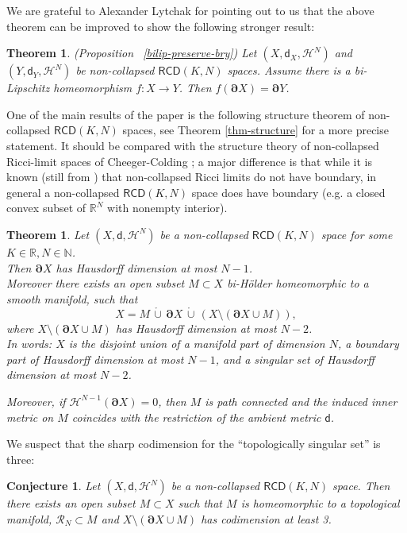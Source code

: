 \documentclass[a4paper]{amsart}
\theoremstyle{plain}
\newtheorem{theorem}[lemma]{Theorem}
\newtheorem{conjecture}[lemma]{Conjecture}
\theoremstyle{definition}
\numberwithin{equation}{section}
\newcommand{\R}{\mathbb{R}}
\newcommand{\N}{\mathbb{N}}
\newcommand{\RCD}{\mathsf{RCD}}
\newcommand{\sfd}{\mathsf d}
\newcommand{\cH}{\mathcal{H}}
\newcommand{\bRCD}{\boldsymbol\partial}
\begin{document}
{ We are grateful to Alexander Lytchak for pointing out to us that the above theorem can be improved to show the following stronger result: 


\begin{theorem}\label{thm:bilip-preserve-bry} (Proposition ~\ref{bilip-preserve-bry})
Let $(X,\sfd_{X},\cH^{N})$ and  $(Y,\sfd_{Y},\cH^{N})$ be non-collapsed  $\RCD(K,N)$ spaces. Assume there is a bi-Lipschitz homeomorphism $f:X\to Y$. Then $f(\bRCD X)=\bRCD Y$.

\end{theorem}

One of the main results of the paper is the following structure theorem of non-collapsed $\RCD(K,N)$ spaces, see Theorem \ref{thm-structure} for a more precise statement. It should  be compared with the structure theory of non-collapsed Ricci-limit spaces of Cheeger-Colding \cite{CC97}; a major difference is that while it is known (still from \cite{CC97}) that non-collapsed Ricci limits do not have boundary, in general a non-collapsed $\RCD(K,N)$ space does have boundary (e.g. a  closed convex subset of $\R^{N}$ with nonempty interior). 

\begin{theorem}\label{thm-structureIntro}
Let $(X,\sfd,\cH^{N})$ be a non-collapsed $\RCD(K,N)$ space for some $K\in \R, N\in \N$.
\\Then $\bRCD X$ has Hausdorff dimension at most $N-1$.
\\Moreover  there exists an open subset $M\subset X$ bi-H\"older homeomorphic to a smooth  manifold, such that
$$
X=M \, \mathring\cup \,  \bRCD X \, \mathring\cup  \, (X\setminus (\bRCD X\cup M)),
$$
where $X\setminus (\bRCD X\cup M)$ has Hausdorff dimension at most $N-2$. 
\\In words:   $X$  is the disjoint union of a manifold part of dimension $N$, a boundary part of Hausdorff dimension at most $N-1$, and a singular set of Hausdorff dimension at most $N-2$. 

Moreover, if $\cH^{N-1}(\bRCD X)=0$, then $M$ is path connected  and the induced inner metric on $M$ coincides with the restriction of the ambient metric $\sfd$.
\end{theorem}

We suspect that the sharp codimension for the ``topologically singular set'' is three:
\begin{conjecture}
 Let $(X,\sfd,\cH^{N})$ be a non-collapsed $\RCD(K,N)$ space. Then there exists an open subset $M\subset X$ such that $M$ is homeomorphic to a topological manifold,  ${\mathcal R}_{N}\subset M$ and $X\setminus(\bRCD X \cup M)$ has codimension at least 3.
\end{conjecture}


}
\end{document}
